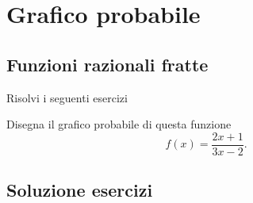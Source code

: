 \chapter{Grafico probabile}
\section{Funzioni razionali fratte}
Risolvi i seguenti esercizi
\tcbstartrecording


\begin{exercise}[no solution]
Disegna il grafico probabile di questa funzione
	\begin{equation*}
	f(x)= \frac{2x+1}{3x-2}.
	\end{equation*}
\end{exercise}
\tcbstoprecording
\newpage
\section{Soluzione esercizi}
\tcbinputrecords
